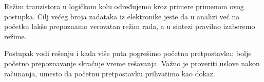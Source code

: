 Režim tranzistora u logičkom kolu određujemo kroz primere primenom ovog postupka. Cilj većeg broja zadataka iz elektronike jeste da u analizi već na početku lakše prepoznamo verovatan režim rada, a u sintezi pravilno izaberemo režime.

Postupak vodi rešenju i kada više puta pogrešimo početnu pretpostavku; bolje početno prepoznavanje skraćuje vreme rešavanja. Važno je proveriti uslove nakon računanja, umesto da početnu pretpostavku prihvatimo kao dokaz.

